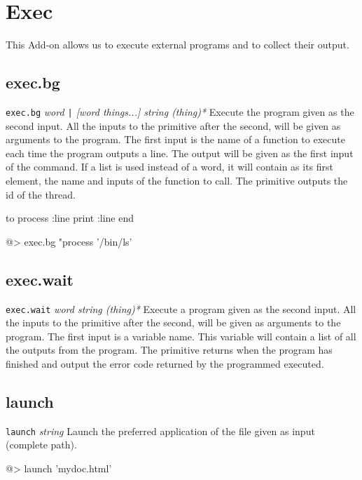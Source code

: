 \section{Exec}

This Add-on allows us to execute external programs and to collect their output.

\subsection*{exec.bg} 

{\tt exec.bg}  {\it word \verb?|? [word things...] string (thing)*}
\newline\newline
Execute the program given as the second input. All the inputs to the primitive after the second, will be given as arguments to the program. The first input is
the name of a function to execute each time the program outputs a line. The output will be given as the first input of the command. If a list is used instead of a word, it will contain as its first element, the name and inputs of the function to call. The primitive outputs the id of the thread.
\begin{verbatimtab}
to process :line
	print :line	
end

@> exec.bg "process '/bin/ls'
\end{verbatimtab}

\subsection*{exec.wait} 

{\tt exec.wait} {\it word string (thing)*}
\newline\newline
Execute a program given as the second input. All the inputs to the primitive after the second, will be given as arguments to the program. The first input is
a variable name. This variable will contain a list of all the outputs from the program. The primitive returns when the program has finished and output the error code returned by the programmed executed.

\subsection*{launch} 

{\tt launch} {\it string}
\newline\newline
Launch the preferred application of the file given as input (complete path).
\begin{verbatimtab}
@> launch 'mydoc.html'
\end{verbatimtab}
